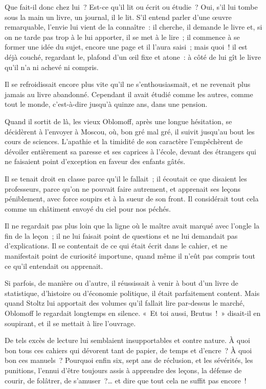 \documentclass[french,twoside]{book} %
\begin{document}
\noindent Que fait-il donc chez lui ? Est-ce qu’il lit ou écrit ou étudie ? Oui, s’il lui tombe sous la main un livre, un journal, il le lit. S’il entend parler d’une œuvre remarquable, l’envie lui vient de la connaître : il cherche, il demande le livre et, si on ne tarde pas trop à le lui apporter, il se met à le lire ; il commence à se former une idée du sujet, encore une page et il l’aura saisi ; mais quoi ! il est déjà couché, regardant le, plafond d’un œil fixe et atone : à côté de lui gît le livre qu’il n’a ni achevé ni compris.\par
Il se refroidissait encore plus vite qu’il ne s’enthousiasmait, et ne revenait plus jamais au livre abandonné. Cependant il avait étudié comme les autres, comme tout le monde, c’est-à-dire jusqu’à quinze ans, dans une pension.\par
Quand il sortit de là, les vieux Oblomoff, après une longue hésitation, se décidèrent à l’envoyer à Moscou, où, bon gré mal gré, il suivit jusqu’au bout les cours de sciences. L’apathie et la timidité de son caractère l’empêchèrent de dévoiler entièrement sa paresse et ses caprices à l’école, devant des étrangers qui ne faisaient point d’exception en faveur des enfants gâtés.\par
Il se tenait droit en classe parce qu’il le fallait ; il écoutait ce que disaient les professeurs, parce qu’on ne pouvait faire autrement, et apprenait ses leçons péniblement, avec force soupirs et à la sueur de son front. Il considérait tout cela comme un châtiment envoyé du ciel pour nos péchés.\par
Il ne regardait pas plus loin que la ligne où le maître avait marqué avec l’ongle la fin de la leçon ; il ne lui faisait point de questions et ne lui demandait pas d’explications. Il se contentait de ce qui était écrit dans le cahier, et ne manifestait point de curiosité importune, quand même il n’eût pas compris tout ce qu’il entendait ou apprenait.\par
Si parfois, de manière ou d’autre, il réussissait à venir à bout d’un livre de statistique, d’histoire ou d’économie politique, il était parfaitement content. Mais quand Stoltz lui apportait des volumes qu’il fallait lire par-dessus le marché, Oblomoff le regardait longtemps en silence. « Et toi aussi, Brutus ! » disait-il en soupirant, et il se mettait à lire l’ouvrage.\par
De tels excès de lecture lui semblaient insupportables et contre nature. À quoi bon tous ces cahiers qui dévorent tant de papier, de temps et d’encre ? À quoi bon ces manuels ? Pourquoi enfin six, sept ans de réclusion, et les sévérités, les punitions, l’ennui d’être toujours assis à apprendre des leçons, la défense de courir, de folâtrer, de s’amuser ?… et dire que tout cela ne suffit pas encore !\par
\end{document}
